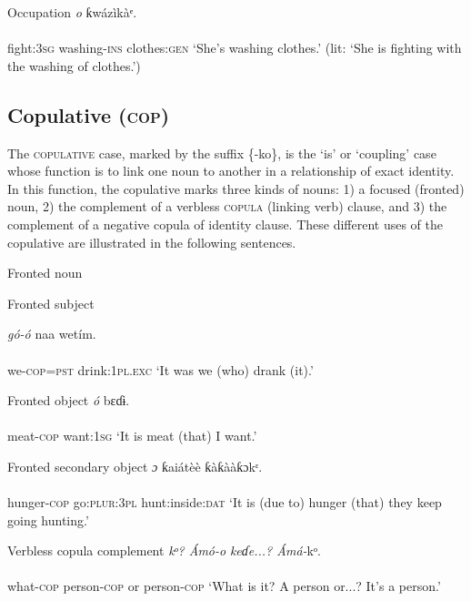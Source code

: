 Occupation
\ea\label{ex:}
\textit{o}   ƙwázìkàᵉ. \\
    \\
fight:\textsc{3sg}   washing-\textsc{ins}   clothes:\textsc{gen}
\glt ‘She’s washing clothes.’ (lit: ‘She is fighting with the washing of clothes.’) 
\z






\subsection{Copulative (\textsc{cop})}


The \textsc{copulative} case, marked by the suffix \{-ko\}, is the ‘is’ or ‘coupling’ case whose function is to link one noun to another in a relationship of exact identity. In this function, the copulative marks three kinds of nouns: 1) a focused (fronted) noun, 2) the complement of a verbless \textsc{copula} (linking verb) clause, and 3) the complement of a negative copula of identity clause. These different uses of the copulative are illustrated in the following sentences.




Fronted noun




Fronted subject


\ea\label{ex:}
\textit{gó-}\textit{ó} naa   wetím. \\
    \\
we-\textsc{cop}=\textsc{pst}   drink:\textsc{1pl.exc}
\glt ‘It was we (who) drank (it).’ 
\z




Fronted object
\ea\label{ex:}
\textit{ó}     bɛɗɨ. \\
    \\
meat-\textsc{cop}   want:\textsc{1sg}
\glt ‘It is meat (that) I want.’ 
\z




Fronted secondary object
\ea\label{ex:}
\textit{ɔ}     ƙaiátèè   ƙàƙààƙɔkᵋ. \\
    \\
hunger-\textsc{cop}   go:\textsc{plur:3pl}   hunt:inside:\textsc{dat}
\glt ‘It is (due to) hunger (that) they keep going hunting.’ 
\z





Verbless copula complement
\ea\label{ex:}
\textit{kᵒ}\textit{?   Ámó-}\textit{o}\textit{   keɗe...?   Ámá-}kᵒ. \\
    \\
what-\textsc{cop}   person-\textsc{cop}   or     person-\textsc{cop}
\glt ‘What is it? A person or...? It’s a person.’ 
\z




